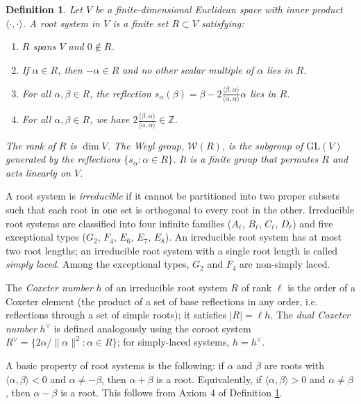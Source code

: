 \documentclass[11pt]{article}
\newtheorem{definition}[theorem]{Definition}
\newcommand{\W}{\mathcal{W}}
\begin{document}
\begin{definition}\label{RootDefn}
Let $V$ be a finite-dimensional Euclidean space with inner product $\langle \cdot, \cdot \rangle$.
A \emph{root system} in $V$ is a finite set $R \subset V$ satisfying:
\begin{enumerate}
    \item $R$ spans $V$ and $0 \notin R$.
    \item If $\alpha \in R$, then $-\alpha \in R$ and no other scalar multiple of $\alpha$ lies in $R$.
    \item For all $\alpha, \beta \in R$, the reflection $s_\alpha(\beta) = \beta - 2\frac{\langle \beta, \alpha \rangle}{\langle \alpha, \alpha \rangle}\alpha$ lies in $R$.
    \item For all $\alpha, \beta \in R$, we have $2\frac{\langle \beta, \alpha \rangle}{\langle \alpha, \alpha \rangle} \in \mathbb{Z}$.
\end{enumerate}
The \emph{rank} of $R$ is $\dim V$. The \emph{Weyl group}, $\W(R)$, is the subgroup of $\mathrm{GL}(V)$ generated by the reflections $\{s_\alpha : \alpha \in R\}$. It is a finite group that permutes $R$ and acts linearly on $V$.
\end{definition}

A root system is \emph{irreducible} if it cannot be partitioned into two proper subsets such that each root in one set is orthogonal to every root in the other. Irreducible root systems are classified into four infinite families ($A_\ell$, $B_\ell$, $C_\ell$, $D_\ell$) and five exceptional types ($G_2$, $F_4$, $E_6$, $E_7$, $E_8$). An irreducible root system has at most two root lengths; an irreducible root system with a single root length is called \emph{simply laced}. Among the exceptional types, $G_2$ and $F_4$ are non-simply laced.

The \emph{Coxeter number} $h$ of an irreducible root system $R$ of rank $\ell$ is the order of a Coxeter element (the product of a set of base reflections in any order, i.e. reflections through a set of simple roots); it satisfies $|R| = \ell h$. The \emph{dual Coxeter number} $h^\vee$ is defined analogously using the coroot system $R^\vee = \{2\alpha/\|\alpha\|^2 : \alpha \in R\}$; for simply-laced systems, $h = h^\vee$.

A basic property of root systems is the following: if $\alpha$ and $\beta$ are roots with $\langle \alpha, \beta \rangle < 0$ and $\alpha \neq -\beta$, then $\alpha + \beta$ is a root. Equivalently, if $\langle \alpha, \beta \rangle > 0$ and $\alpha \neq \beta$, then $\alpha - \beta$ is a root. This follows from Axiom 4 of Definition \ref{RootDefn}.
\end{document}
